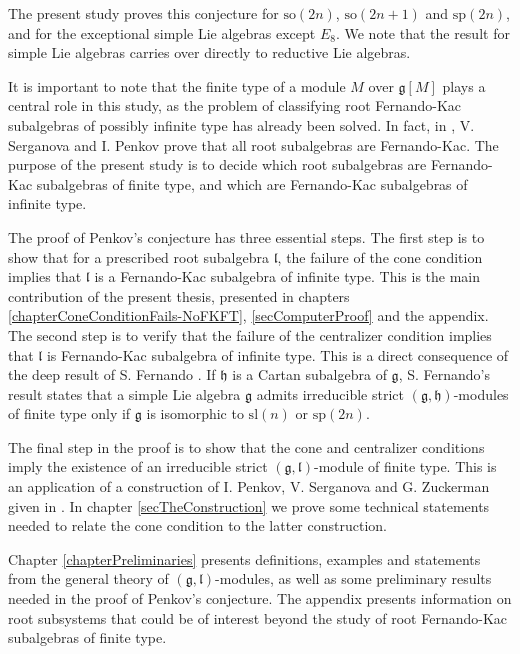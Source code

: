 \documentclass[12pt]{report}
\newcommand{\hh}{\mathfrak{h}}
\newcommand{\gG}{\mathfrak{g}}
\newcommand{\lL}{\mathfrak{l}}
\newcommand{\sL}{\mathrm{sl}}
\newcommand{\sP}{\mathrm{sp}}
\newcommand{\so}{\mathrm{so}}
\begin{document}
The present study proves this conjecture for $\so(2n)$, $\so(2n+1)$ and $\sP(2n)$, and for the exceptional simple Lie algebras except $ E_8$. We note that the result for simple Lie algebras carries over directly to reductive Lie algebras. %

It is important to note that the finite type of a module $M$ over $\gG[M]$ plays a central role in this study, as the problem of classifying root Fernando-Kac subalgebras of possibly infinite type has already been solved. In fact, in \cite{PS:GenHarishChandra}, V. Serganova and I. Penkov prove that all root subalgebras are Fernando-Kac. The purpose of the present study is to decide which root subalgebras are Fernando-Kac subalgebras of finite type, and which are Fernando-Kac subalgebras of infinite type.

The proof of Penkov's conjecture has three essential steps. The first step is to show that for a prescribed root subalgebra $\lL$, the failure of the cone condition implies that  $\lL$ is a Fernando-Kac subalgebra of infinite type. This is the main contribution of the present thesis, presented in chapters \ref{chapterConeConditionFails-NoFKFT}, \ref{secComputerProof} and the appendix. The second step is to verify that the failure of the centralizer condition implies that  $\lL$ is Fernando-Kac subalgebra of infinite type. This is a direct consequence of the deep result of S. Fernando \cite{Fernando1}. If $\hh$ is a Cartan subalgebra of $\gG$, S. Fernando's result states that a simple Lie algebra $\gG$ admits irreducible strict $(\gG,\hh)$-modules of finite type only if $\gG$ is isomorphic to $\sL(n)$ or $\sP(2n)$.

The final step in the proof is to show that the cone and centralizer conditions imply the existence of an irreducible strict $(\gG,\lL)$-module of finite type. This is an application of a construction of I. Penkov, V. Serganova and G. Zuckerman given in \cite{PSZ}. In chapter \ref{secTheConstruction} we prove some technical statements needed to relate the cone condition to the latter construction.

Chapter \ref{chapterPreliminaries} presents definitions, examples and statements from the general theory of $(\gG,\lL)$-modules, as well as some preliminary results needed in the proof of Penkov's conjecture. The appendix presents information on root subsystems that could be of interest beyond the study of root Fernando-Kac subalgebras of finite type.
\end{document}
